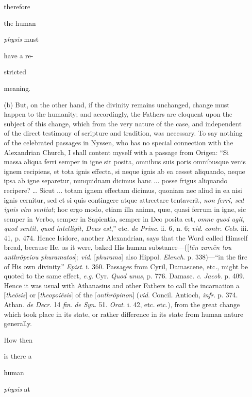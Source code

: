 therefore

the human

\emph{physis} must

have a re-

stricted

meaning.

(b) But, on the other hand, if the divinity
remains unchanged, change must happen to the humanity; and
accordingly, the Fathers are eloquent upon the subject of this
change, which from the very nature of the case, and
independent of the direct testimony of scripture and
tradition, was necessary. To say nothing of the celebrated
passages in Nyssen, who has no special connection with the
Alexandrian Church, I shall content myself with a passage from
Origen: ``Si massa aliqua ferri semper in igne sit posita,
omnibus suis poris omnibusque venis ignem recipiens, et tota
ignis effecta, si neque ignis ab ea cesset aliquando, neque
ipsa ab igne separetur, nunquidnam dicimus hanc ... posse
frigus aliquando recipere? … Sicut ... totam ignem effectam
dicimus, quoniam nec aliud in ea nisi ignis cernitur,
sed et si quis contingere atque attrectare tentaverit, \emph{non
ferri, sed ignis vim sentiat}; hoc ergo modo, etiam illa
anima, quæ, quasi ferrum in igne, sic semper in Verbo, semper
in Sapientia, semper in Deo posita est, \emph{omne quod agit,
quod sentit, quod intelligit, Deus est},'' etc. \emph{de
Princ}. ii. 6, n. 6; \emph{vid}. \emph{contr}. \emph{Cels}.
iii. 41, p. 474. Hence Isidore, another Alexandrian, says that
the Word called Himself bread, because He, as it were, baked
His human substance—([\emph{t\={e}n zum\={e}n tou anthr\={o}peiou
phuramatos}]; \emph{vid}. [\emph{phurama}] also Hippol. \emph{Elench}.
p. 338)—``in the fire of His own divinity.'' \emph{Epist}.
i. 360. Passages from Cyril, Damascene, etc., might be quoted
to the same effect, \emph{e}.\emph{g}. Cyr. \emph{Quod unus},
p. 776. Damasc. \emph{c}. \emph{Jacob}. p. 409. Hence it was
usual with Athanasius and other Fathers to call the
incarnation a [\emph{the\={o}sis}] or [\emph{theopoi\={e}sis}]
of the [\emph{anthr\={o}pinon}] (\emph{vid}. Concil.
Antioch, \emph{infr}. p. 374. Athan. \emph{de Decr}. 14 \emph{fin}.
\emph{de Syn}. 51. \emph{Orat}. i. 42, etc. etc.), from the
great change which took place in its state, or rather
difference in its state from human nature generally.

How then

is there a

human

\emph{physis} at

